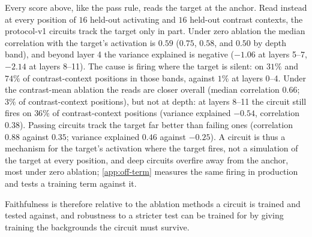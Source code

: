 \documentclass[10pt]{article}
\begin{document}
Every score above, like the pass rule, reads the target at the anchor.
Read instead at every position of $16$ held-out activating and $16$ held-out contrast contexts, the protocol-v1 circuits track the target only in part.
Under zero ablation the median correlation with the target's activation is $0.59$ ($0.75$, $0.58$, and $0.50$ by depth band), and beyond layer 4 the variance explained is negative ($-1.06$ at layers 5--7, $-2.14$ at layers 8--11).
The cause is firing where the target is silent: on $31\%$ and $74\%$ of contrast-context positions in those bands, against $1\%$ at layers 0--4.
Under the contrast-mean ablation the reads are closer overall (median correlation $0.66$; $3\%$ of contrast-context positions), but not at depth: at layers 8--11 the circuit still fires on $36\%$ of contrast-context positions (variance explained $-0.54$, correlation $0.38$).
Passing circuits track the target far better than failing ones (correlation $0.88$ against $0.35$; variance explained $0.46$ against $-0.25$).
A circuit is thus a mechanism for the target's activation where the target fires, not a simulation of the target at every position, and deep circuits overfire away from the anchor, most under zero ablation; \cref{app:off-term} measures the same firing in production and tests a training term against it.

Faithfulness is therefore relative to the ablation methods a circuit is trained and tested against, and robustness to a stricter test can be trained for by giving training the backgrounds the circuit must survive.
\end{document}
